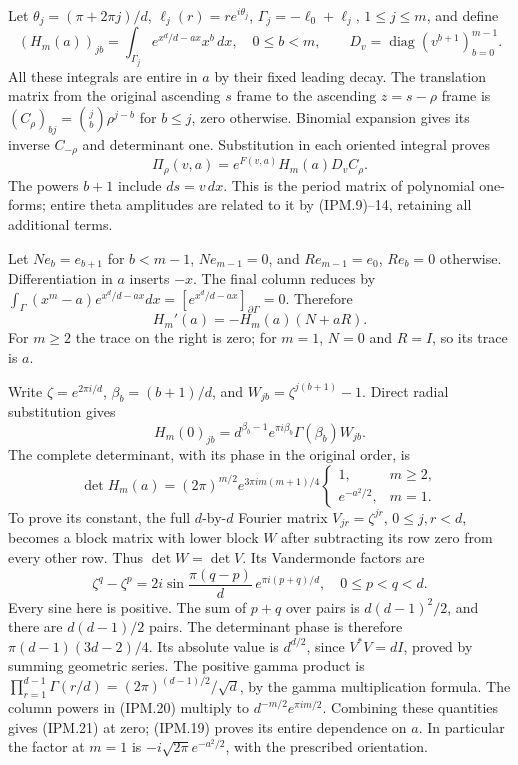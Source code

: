 \documentclass[11pt,a4paper]{article}
\theoremstyle{definition}
\begin{document}
Let \(\theta_j=(\pi+2\pi j)/d\),
\(\ell_j(r)=re^{i\theta_j}\),
\(\Gamma_j=-\ell_0+\ell_j\), \(1\le j\le m\), and define
\[
 (H_m(a))_{jb}=\int_{\Gamma_j}e^{x^d/d-ax}x^b\,dx,
 \quad0\le b<m,\qquad
 D_v=\operatorname{diag}(v^{b+1})_{b=0}^{m-1}.
 \tag{IPM.17}
\]
All these integrals are entire in \(a\) by their fixed leading decay.
The translation matrix from the original ascending \(s\) frame to
the ascending \(z=s-\rho\) frame is
\( (C_\rho)_{bj}=\binom jb\rho^{j-b}\) for \(b\le j\), zero
otherwise. Binomial expansion gives its inverse \(C_{-\rho}\) and
determinant one. Substitution in each oriented integral proves
\[
 \Pi_\rho(v,a)=e^{F(v,a)}H_m(a)D_vC_\rho.
 \tag{IPM.18}
\]
The powers \(b+1\) include \(ds=v\,dx\). This is the period matrix
of polynomial one-forms; entire theta amplitudes are related to it by
(IPM.9)--14, retaining all additional terms.

Let \(Ne_b=e_{b+1}\) for \(b<m-1\), \(Ne_{m-1}=0\), and
\(Re_{m-1}=e_0\), \(Re_b=0\) otherwise. Differentiation in \(a\)
inserts \(-x\). The final column reduces by
\(\int_\Gamma(x^m-a)e^{x^d/d-ax}dx
=[e^{x^d/d-ax}]_{\partial\Gamma}=0\). Therefore
\[
 H_m'(a)=-H_m(a)(N+aR).
 \tag{IPM.19}
\]
For \(m\ge2\) the trace on the right is zero; for \(m=1\),
\(N=0\) and \(R=I\), so its trace is \(a\).

Write \(\zeta=e^{2\pi i/d}\), \(\beta_b=(b+1)/d\), and
\(W_{jb}=\zeta^{j(b+1)}-1\). Direct radial substitution gives
\[
 H_m(0)_{jb}
   =d^{\beta_b-1}e^{\pi i\beta_b}\Gamma(\beta_b)W_{jb}.
 \tag{IPM.20}
\]
The complete determinant, with its phase in the original order, is
\[
 \det H_m(a)=
 (2\pi)^{m/2}e^{3\pi i m(m+1)/4}
 \begin{cases}1,&m\ge2,\\ e^{-a^2/2},&m=1.\end{cases}
 \tag{IPM.21}
\]
To prove its constant, the full \(d\)-by-\(d\) Fourier matrix
\(V_{jr}=\zeta^{jr}\), \(0\le j,r<d\), becomes a block matrix
with lower block \(W\) after subtracting its row zero from every
other row. Thus \(\det W=\det V\). Its Vandermonde factors are
\[
 \zeta^q-\zeta^p
  =2i\sin\frac{\pi(q-p)}d\,
                         e^{\pi i(p+q)/d},\quad0\le p<q<d.
\]
Every sine here is positive. The sum of \(p+q\) over pairs is
\(d(d-1)^2/2\), and there are \(d(d-1)/2\) pairs. The determinant
phase is therefore \(\pi(d-1)(3d-2)/4\). Its absolute value is
\(d^{d/2}\), since \(V^*V=dI\), proved by summing geometric series.
The positive gamma product is
\(\prod_{r=1}^{d-1}\Gamma(r/d)=(2\pi)^{(d-1)/2}/\sqrt d\),
by the gamma multiplication formula. The column powers in (IPM.20)
multiply to \(d^{-m/2}e^{\pi i m/2}\). Combining these quantities
gives (IPM.21) at zero; (IPM.19) proves its entire dependence on \(a\).
In particular the factor at \(m=1\) is
\(-i\sqrt{2\pi}e^{-a^2/2}\), with the prescribed orientation.
\end{document}
